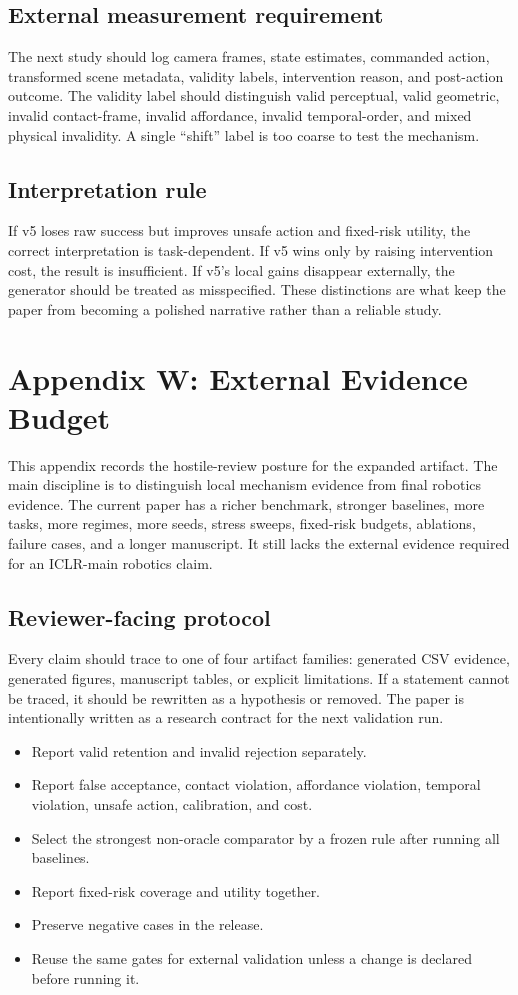 \documentclass{article}
\begin{document}
\subsection{External measurement requirement}
The next study should log camera frames, state estimates, commanded action, transformed scene metadata, validity labels, intervention reason, and post-action outcome. The validity label should distinguish valid perceptual, valid geometric, invalid contact-frame, invalid affordance, invalid temporal-order, and mixed physical invalidity. A single ``shift'' label is too coarse to test the mechanism.

\subsection{Interpretation rule}
If v5 loses raw success but improves unsafe action and fixed-risk utility, the correct interpretation is task-dependent. If v5 wins only by raising intervention cost, the result is insufficient. If v5's local gains disappear externally, the generator should be treated as misspecified. These distinctions are what keep the paper from becoming a polished narrative rather than a reliable study.


\section{Appendix W: External Evidence Budget}
This appendix records the hostile-review posture for the expanded artifact. The main discipline is to distinguish local mechanism evidence from final robotics evidence. The current paper has a richer benchmark, stronger baselines, more tasks, more regimes, more seeds, stress sweeps, fixed-risk budgets, ablations, failure cases, and a longer manuscript. It still lacks the external evidence required for an ICLR-main robotics claim.

\subsection{Reviewer-facing protocol}
Every claim should trace to one of four artifact families: generated CSV evidence, generated figures, manuscript tables, or explicit limitations. If a statement cannot be traced, it should be rewritten as a hypothesis or removed. The paper is intentionally written as a research contract for the next validation run.

\begin{itemize}
\item Report valid retention and invalid rejection separately.
\item Report false acceptance, contact violation, affordance violation, temporal violation, unsafe action, calibration, and cost.
\item Select the strongest non-oracle comparator by a frozen rule after running all baselines.
\item Report fixed-risk coverage and utility together.
\item Preserve negative cases in the release.
\item Reuse the same gates for external validation unless a change is declared before running it.
\end{itemize}
\end{document}
